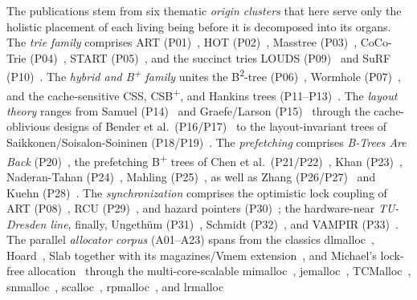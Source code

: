 \begin{nurlang}
The publications stem from six thematic \emph{origin clusters} that here serve only the holistic
placement of each living being before it is decomposed into its organs. The
\emph{trie family} comprises ART (P01)~\cite{leis2013art}, HOT (P02)~\cite{binna2018hot}, Masstree
(P03)~\cite{mao2012masstree}, CoCo-Trie (P04)~\cite{boffa2024coco}, START (P05)~\cite{fent2020start},
and the succinct tries LOUDS (P09)~\cite{jacobson1989louds} and SuRF (P10)~\cite{zhang2018surf}. The
\emph{hybrid and B\textsuperscript{+} family} unites the B\textsuperscript{2}-tree
(P06)~\cite{schmeisser2022b2tree}, Wormhole (P07)~\cite{wu2019wormhole}, and the cache-sensitive CSS,
CSB\textsuperscript{+}, and Hankins trees (P11--P13)~\cite{rao1999css,rao2000csb,hankins2003nodesize}.
The \emph{layout theory} ranges from Samuel (P14)~\cite{samuel2005procaware} and Graefe/Larson
(P15)~\cite{graefe2001btree} through the cache-oblivious designs of Bender et
al.\ (P16/P17)~\cite{bender2000cobtree,bender2005coboblivious,bender2002treelayout,bender2002scanning,bender2002orderlist}
to the layout-invariant trees of Saikkonen/Soisalon-Soininen
(P18/P19)~\cite{saikkonen2008multilevel,saikkonen2016layout}. The \emph{prefetching} comprises \emph{B-Trees
Are Back} (P20)~\cite{mueller2025btreesback}, the prefetching B\textsuperscript{+} trees of Chen et
al.\ (P21/P22)~\cite{chen2001prefetch,chen2002fractal}, Khan (P23)~\cite{khan2010adaptive}, Naderan-Tahan
(P24)~\cite{naderan2016adaptivefilter}, Mahling (P25)~\cite{mahling2025hotpath}, as well as Zhang
(P26/P27)~\cite{zhang2024pathprefix,zhang2025hierarchical} and Kuehn (P28)~\cite{kuehn2023bplustree}. The
\emph{synchronization} comprises the optimistic lock coupling of ART (P08)~\cite{leis2016olc}, RCU
(P29)~\cite{mckenney2001rcu}, and hazard pointers (P30)~\cite{michael2004hazard}; the hardware-near
\emph{TU-Dresden line}, finally, Ungethüm (P31)~\cite{ungethuem2017survey}, Schmidt
(P32)~\cite{schmidt2025hbm}, and VAMPIR (P33)~\cite{berthold2023vampir}. The parallel
\emph{allocator corpus} (A01--A23) spans from the classics dlmalloc~\cite{lea1996dlmalloc},
Hoard~\cite{berger2000hoard}, Slab together with its magazines/Vmem extension~\cite{bonwick1994slab,bonwick2001vmem},
and Michael's lock-free
allocation~\cite{michael2004lockfree} through the multi-core-scalable mimalloc~\cite{leijen2019mimalloc},
jemalloc~\cite{evans2006jemalloc}, TCMalloc~\cite{ghemawat2005tcmalloc}, snmalloc~\cite{lietar2019snmalloc},
scalloc~\cite{aigner2015scalloc}, rpmalloc~\cite{jansson2017rpmalloc}, and lrmalloc~\cite{leite2018lrmalloc}

\end{nurlang}
